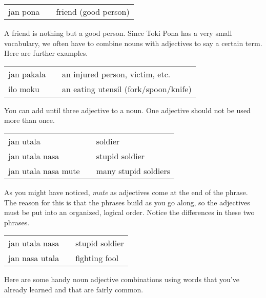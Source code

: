 \begin{supertabular}{p{5,5cm}|ll}
jan pona && friend (good person) \\
\end{supertabular} 

A friend is nothing but a good person.
Since Toki Pona has a very small vocabulary, we often have to combine nouns with adjectives to say a certain term. 
Here are further examples. 

\begin{supertabular}{p{5,5cm}|ll}
jan pakala && an injured person, victim, etc. \\
ilo moku && an eating utensil (fork/spoon/knife) \\
\end{supertabular} 

You can add until three adjective to a noun. 
One adjective should not be used more than once.

\begin{supertabular}{p{5,5cm}|ll}
jan utala && soldier  \\
jan utala nasa && stupid soldier  \\
jan utala nasa mute && many stupid soldiers  \\
\end{supertabular} 

As you might have noticed, \textit{mute} as adjectives come at the end of the phrase. 
The reason for this is that the phrases build as you go along, so the adjectives must be put into an organized, logical order. 
Notice the differences in these two phrases.

\begin{supertabular}{p{5,5cm}|ll}
jan utala nasa && stupid soldier  \\
jan nasa utala && fighting fool \\
\end{supertabular}

Here are some handy noun adjective combinations using words that you've already learned and that are fairly common.

